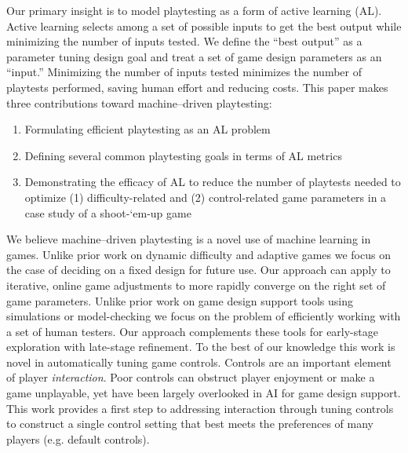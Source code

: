 \documentclass{sig-alternate}
\begin{document}
Our primary insight is to model playtesting as a form of active learning (AL).
Active learning \cite{settles2012:al-book} selects among a set of possible inputs to get the best output while minimizing the number of inputs tested.
We define the ``best output'' as a parameter tuning design goal and treat a set of game design parameters as an ``input.''
Minimizing the number of inputs tested minimizes the number of playtests performed, saving human effort and reducing costs.
This paper makes three contributions toward machine--driven playtesting:
\begin{enumerate}
\item Formulating efficient playtesting as an AL problem
\item Defining several common playtesting goals in terms of AL metrics
\item Demonstrating the efficacy of AL to reduce the number of playtests needed to optimize (1) difficulty-related and (2) control-related game parameters in a case study of a shoot-`em-up game
\end{enumerate}

We believe machine--driven playtesting is a novel use of machine learning in games.
Unlike prior work on dynamic difficulty and adaptive games we focus on the case of deciding on a fixed design for future use.
Our approach can apply to iterative, online game adjustments to more rapidly converge on the right set of game parameters.
Unlike prior work on game design support tools using simulations or model-checking we focus on the problem of efficiently working with a set of human testers.
Our approach complements these tools for early-stage exploration with late-stage refinement.
To the best of our knowledge this work is novel in automatically tuning game controls. %
Controls are an important element of player \textit{interaction}.
Poor controls can obstruct player enjoyment or make a game unplayable, yet have been largely overlooked in AI for game design support.
This work provides a first step to addressing interaction through tuning controls to construct a single control setting that best meets the preferences of many players (e.g. default controls).
\end{document}
